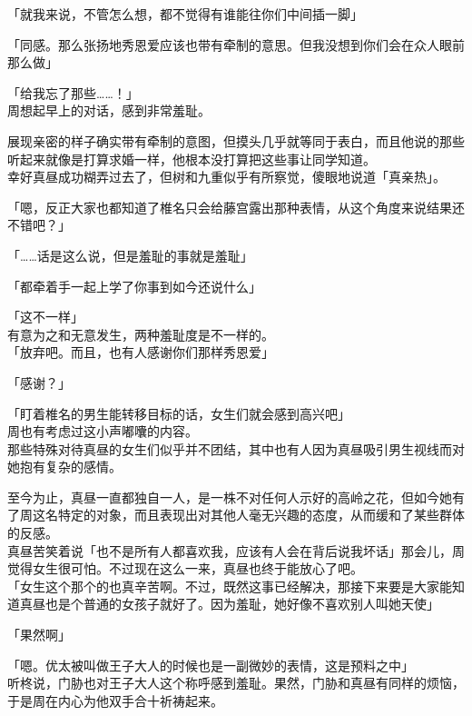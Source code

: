 「就我来说，不管怎么想，都不觉得有谁能往你们中间插一脚」

「同感。那么张扬地秀恩爱应该也带有牵制的意思。但我没想到你们会在众人眼前那么做」

「给我忘了那些……！」\\

周想起早上的对话，感到非常羞耻。

展现亲密的样子确实带有牵制的意图，但摸头几乎就等同于表白，而且他说的那些听起来就像是打算求婚一样，他根本没打算把这些事让同学知道。\\

幸好真昼成功糊弄过去了，但树和九重似乎有所察觉，傻眼地说道「真亲热」。

「嗯，反正大家也都知道了椎名只会给藤宫露出那种表情，从这个角度来说结果还不错吧？」

「……话是这么说，但是羞耻的事就是羞耻」

「都牵着手一起上学了你事到如今还说什么」

「这不一样」\\

有意为之和无意发生，两种羞耻度是不一样的。\\

「放弃吧。而且，也有人感谢你们那样秀恩爱」

「感谢？」

「盯着椎名的男生能转移目标的话，女生们就会感到高兴吧」\\

周也有考虑过这小声嘟囔的内容。\\

那些特殊对待真昼的女生们似乎并不团结，其中也有人因为真昼吸引男生视线而对她抱有复杂的感情。

至今为止，真昼一直都独自一人，是一株不对任何人示好的高岭之花，但如今她有了周这名特定的对象，而且表现出对其他人毫无兴趣的态度，从而缓和了某些群体的反感。\\

真昼苦笑着说「也不是所有人都喜欢我，应该有人会在背后说我坏话」那会儿，周觉得女生很可怕。不过现在这么一来，真昼也终于能放心了吧。\\

「女生这个那个的也真辛苦啊。不过，既然这事已经解决，那接下来要是大家能知道真昼也是个普通的女孩子就好了。因为羞耻，她好像不喜欢别人叫她天使」

「果然啊」

「嗯。优太被叫做王子大人的时候也是一副微妙的表情，这是预料之中」\\

听柊说，门胁也对王子大人这个称呼感到羞耻。果然，门胁和真昼有同样的烦恼，于是周在内心为他双手合十祈祷起来。\\

